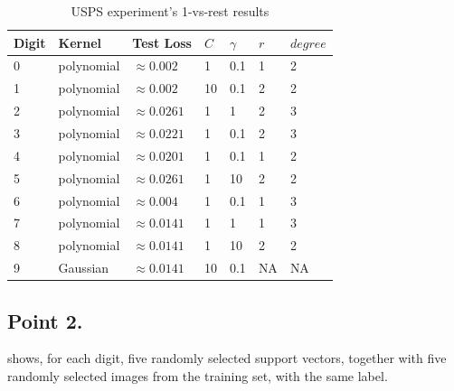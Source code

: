 \documentclass[a4paper,11pt]{article}
\begin{document}
\begin{table}
    \centering
    \begin{tabular*}{0.775\textwidth}{|l|l|l|l|l|l|l|}
        \hline
        Digit & Kernel     & Test Loss        & $C$ & $\gamma$ & $r$ & $degree$ \\
        \hline
        0     & polynomial & $\approx 0.002$  & 1   & 0.1      & 1   & 2        \\
        1     & polynomial & $\approx 0.002$  & 10  & 0.1      & 2   & 2        \\
        2     & polynomial & $\approx 0.0261$ & 1   & 1        & 2   & 3        \\
        3     & polynomial & $\approx 0.0221$ & 1   & 0.1      & 2   & 3        \\
        4     & polynomial & $\approx 0.0201$ & 1   & 0.1      & 1   & 2        \\
        5     & polynomial & $\approx 0.0261$ & 1   & 10       & 2   & 2        \\
        6     & polynomial & $\approx 0.004$  & 1   & 0.1      & 1   & 3        \\
        7     & polynomial & $\approx 0.0141$ & 1   & 1        & 1   & 3        \\
        8     & polynomial & $\approx 0.0141$ & 1   & 10       & 2   & 2        \\
        9     & Gaussian   & $\approx 0.0141$ & 10  & 0.1      & NA  & NA       \\
        \hline
    \end{tabular*}
    \caption{USPS experiment's 1-vs-rest results}
    \label{tab:table3}
\end{table}

\subsection*{Point 2.}

 shows, for each digit, five randomly selected support vectors, together with five randomly selected images from the training set, with the same label.
\end{document}
